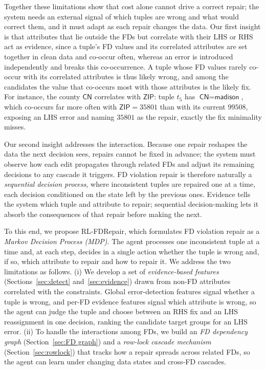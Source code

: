 \documentclass[sigconf]{acmart}
\begin{document}
Together these limitations show that cost alone cannot drive a correct repair; the system needs an external signal of which tuples are wrong and what would correct them, and it must adapt as each repair changes the data. Our first insight is that attributes that lie outside the FDs but correlate with their LHS or RHS act as evidence, since a tuple's FD values and its correlated attributes are set together in clean data and co-occur often, whereas an error is introduced independently and breaks this co-occurrence. A tuple whose FD values rarely co-occur with its correlated attributes is thus likely wrong, and among the candidates the value that co-occurs most with those attributes is the likely fix. For instance, the county $\textsf{CN}$ correlates with $\textsf{ZIP}$: tuple $t_5$ has $\textsf{CN}=\textsf{madison}$, which co-occurs far more often with $\textsf{ZIP}=35801$ than with its current $99508$, exposing an LHS error and naming $35801$ as the repair, exactly the fix minimality misses.

Our second insight addresses the interaction. Because one repair reshapes the data the next decision sees, repairs cannot be fixed in advance; the system must observe how each edit propagates through related FDs and adjust its remaining decisions to any cascade it triggers. FD violation repair is therefore naturally a \emph{sequential decision process}, where inconsistent tuples are repaired one at a time, each decision conditioned on the state left by the previous ones. Evidence tells the system which tuple and attribute to repair; sequential decision-making lets it absorb the consequences of that repair before making the next.

To this end, we propose RL-FDRepair, which formulates FD violation repair as a \textit{Markov Decision Process (MDP)}. The agent processes one inconsistent tuple at a time and, at each step, decides in a single action whether the tuple is wrong and, if so, which attribute to repair and how to repair it. We address the two limitations as follows. (i) We develop a set of \textit{evidence-based features} (Sections~\ref{sec:detect} and~\ref{sec:evidence}) drawn from non-FD attributes correlated with the constraints. Global error-detection features signal whether a tuple is wrong, and per-FD evidence features signal which attribute is wrong, so the agent can judge the tuple and choose between an RHS fix and an LHS reassignment in one decision, ranking the candidate target groups for an LHS error. (ii) To handle the interactions among FDs, we build an \textit{FD dependency graph} (Section~\ref{sec:FD graph}) and a \textit{row-lock cascade mechanism} (Section~\ref{sec:rowlock}) that tracks how a repair spreads across related FDs, so the agent can learn under changing data states and cross-FD cascades.
\end{document}
